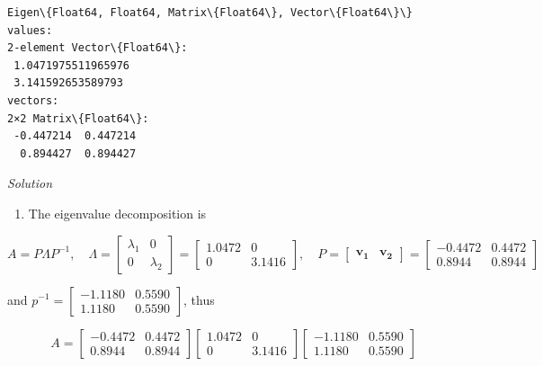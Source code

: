 \documentclass[11pt]{article}
\providecommand{\tightlist}{%
      \setlength{\itemsep}{0pt}\setlength{\parskip}{0pt}}
\begin{document}
    
    \begin{Verbatim}[commandchars=\\\{\}]
Eigen\{Float64, Float64, Matrix\{Float64\}, Vector\{Float64\}\}
values:
2-element Vector\{Float64\}:
 1.0471975511965976
 3.141592653589793
vectors:
2×2 Matrix\{Float64\}:
 -0.447214  0.447214
  0.894427  0.894427
    \end{Verbatim}

    
    \emph{Solution}

    \begin{enumerate}
\def\labelenumi{(\alph{enumi})}
\tightlist
\item
  The eigenvalue decomposition is
\end{enumerate}

\[
    A = P\Lambda P^{-1},\quad 
    \Lambda = \begin{bmatrix}
        \lambda_1&0\\0&\lambda_2
    \end{bmatrix} = \begin{bmatrix}
        1.0472&0\\0&3.1416
    \end{bmatrix},\quad P = \begin{bmatrix}
        \mathbf{v_1}&\mathbf{v_2}
    \end{bmatrix} = \begin{bmatrix}
        -0.4472&0.4472\\0.8944&0.8944
    \end{bmatrix}
\]

and
\(p^{-1}=\begin{bmatrix}  -1.1180&0.5590\\1.1180&0.5590  \end{bmatrix}\),
thus

\[
    A = \begin{bmatrix}
        -0.4472&0.4472\\0.8944&0.8944
    \end{bmatrix}\begin{bmatrix}
        1.0472&0\\0&3.1416
    \end{bmatrix}\begin{bmatrix}
        -1.1180&0.5590\\1.1180&0.5590
    \end{bmatrix}
\]
\end{document}
